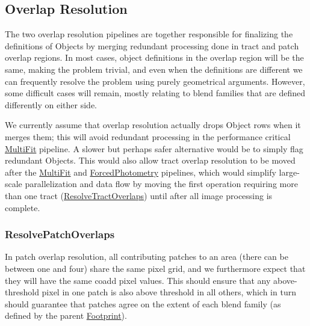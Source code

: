 \subsection{Overlap Resolution}
\label{sec:drp_overlap_resolution}

The two overlap resolution pipelines are together responsible for finalizing the definitions of Objects by merging redundant processing done in tract and patch overlap regions.  In most cases, object definitions in the overlap region will be the same, making the problem trivial, and even when the definitions are different we can frequently resolve the problem using purely geometrical arguments.  However, some difficult cases will remain, mostly relating to blend families that are defined differently on either side.

We currently assume that overlap resolution actually drops Object rows when it merges them; this will avoid redundant processing in the performance critical \hyperref[sec:drpMultiFit]{MultiFit} pipeline.  A slower but perhaps safer alternative would be to simply flag redundant Objects.  This would also allow tract overlap resolution to be moved after the \hyperref[sec:drpMultiFit]{MultiFit} and \hyperref[sec:drpForcedPhotometry]{ForcedPhotometry} pipelines, which would simplify large-scale parallelization and data flow by moving the first operation requiring more than one tract (\hyperref[sec:drpResolveTractOverlaps]{ResolveTractOverlaps}) until after all image processing is complete.

\subsubsection{ResolvePatchOverlaps}
\label{sec:drpResolvePatchOverlaps}

In patch overlap resolution, all contributing patches to an area (there can be between one and four) share the same pixel grid, and we furthermore expect that they will have the same coadd pixel values.  This should ensure that any above-threshold pixel in one patch is also above threshold in all others, which in turn should guarantee that patches agree on the extent of each blend family (as defined by the parent \hyperref[sec:spFootprints]{Footprint}).

